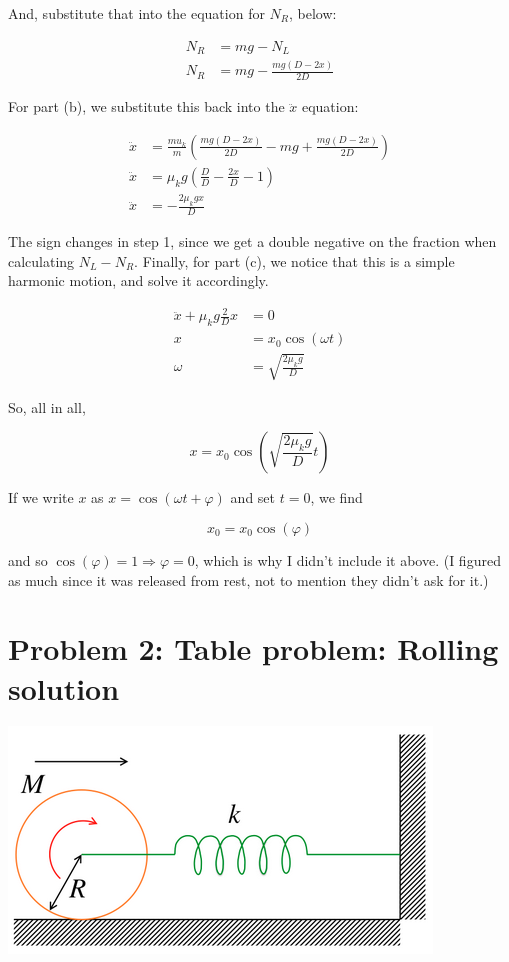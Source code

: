 \documentclass[8.01x]{subfiles}
\begin{document}
And, substitute that into the equation for $N_R$, below:

\begin{align}
N_R &= m g - N_L\\
N_R &= m g - \frac{m g(D - 2x)}{2D}
\end{align}

For part (b), we substitute this back into the $\ddot{x}$ equation:

\begin{align}
\ddot{x} &= \frac{mu_k}{m} \left(\frac{m g(D - 2x)}{2D} - m g + \frac{m g(D - 2x)}{2D}\right)\\
\ddot{x} &= \mu_k g \left(\frac{D}{D}  - \frac{2x}{D} - 1\right)\\
\ddot{x} &= - \frac{2 \mu_k g x}{D}
\end{align}

The sign changes in step 1, since we get a double negative on the fraction when calculating $N_L - N_R$. Finally, for part (c), we notice that this is a simple harmonic motion, and solve it accordingly.

\begin{align}
\ddot{x} + \mu_k g \frac{2}{D} x &= 0\\
x &= x_0 \cos(\omega t)\\
\omega &= \sqrt{\frac{2 \mu_k g}{D}}
\end{align}

So, all in all,

\begin{equation}
x = x_0 \cos\left(\sqrt{\frac{2 \mu_k g}{D}} t \right)
\end{equation}

If we write $x$ as $x = \cos (\omega t + \varphi)$ and set $t = 0$, we find

\begin{equation}
x_0 = x_0 \cos(\varphi)
\end{equation}

and so $\cos(\varphi) = 1 \Rightarrow \varphi = 0$, which is why I didn't include it above. (I figured as much since it was released from rest, not to mention they didn't ask for it.)

\section{Problem 2: Table problem: Rolling solution}

\begin{center}
\includegraphics[scale=0.7]{Graphics/h10p2}
\end{center}
\end{document}
